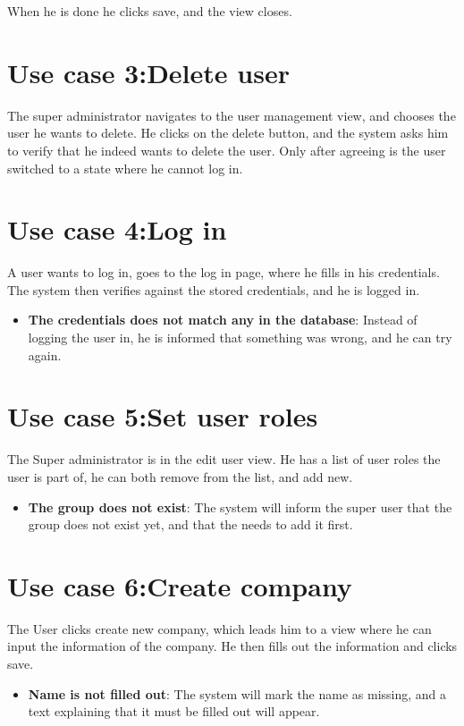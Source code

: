 When he is done he clicks save, and the view closes.

\section{Use case 3:Delete user }
The super administrator navigates to the user management view, and chooses the user he wants to delete. He clicks on the delete button, and the system asks him to verify that he indeed wants to delete the user. Only after agreeing is the user switched to a state where he cannot log in.

\section{Use case 4:Log in }
A user wants to log in, goes to the log in page, where he fills in his credentials. The system then verifies against the stored credentials, and he is logged in.
\begin{itemize}
  \item \textbf{The credentials does not match any in the database}: Instead of logging the user in, he is informed that something was wrong, and he can try again.
\end{itemize}

\section{Use case 5:Set user roles }
The Super administrator is in the edit user view. He has a list of user roles the user is part of, he can both remove from the list, and add new.

\begin{itemize}
  \item \textbf{The group does not exist}: The system will inform the super user that the group does not exist yet, and that the needs to add it first.
\end{itemize}

\section{Use case 6:Create company }
The User clicks create new company, which leads him to a view where he can input the information of the company. He then fills out the information and clicks save.
\begin{itemize}
  \item \textbf{Name is not filled out}: The system will mark the name as missing, and a text explaining that it must be filled out will appear.
\end{itemize}

